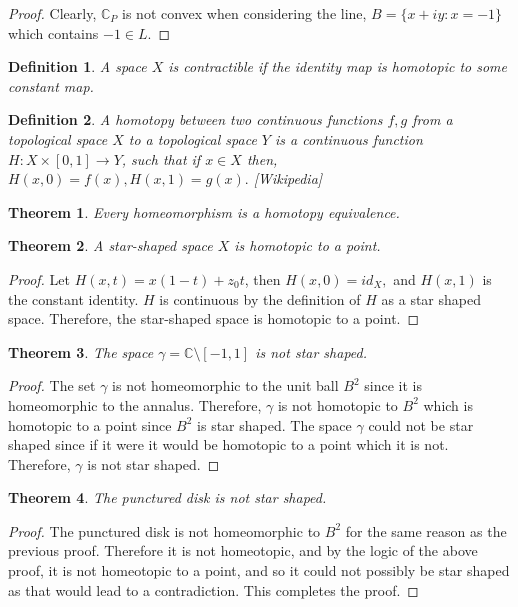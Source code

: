 \documentclass[letter]{article}
\newtheorem{theorem}{Theorem}
\newtheorem{definition}{Definition}
\newenvironment{menumerate}{%
  \edef\backupindent{\the\parindent}%
  \enumerate%
  \setlength{\parindent}{\backupindent}%
}{\endenumerate}
\begin{document}
\begin{menumerate}
\begin{proof}
		Clearly, $\mathbb{C}_P$ is not convex when considering the line, $B = \{x + iy : x = -1\}$ which contains $-1 \in L.$
 	\end{proof}
 	\begin{definition}
 		A space $X$ is contractible if the identity map is homotopic to some constant map.
 	\end{definition}
 	\begin{definition}
 		A homotopy between two continuous functions $f,g$ from a topological space $X$ to a topological space $Y$ is a continuous function $H: X \times [0,1] \to Y$, such that if $x \in X$ then,
 		$H(x,0) = f(x), H(x,1) = g(x).$ [Wikipedia]
 	\end{definition}
 	\begin{theorem}
 		Every homeomorphism is a homotopy equivalence.
 	\end{theorem}
 	\begin{theorem}
 		A star-shaped space $X$ is homotopic to a point.
 	\end{theorem}
 	\begin{proof}
 		Let $H(x,t) = x(1-t)+z_0t$, then $H(x,0) = id_X,$ and $H(x,1)$ is the constant identity. $H$ is continuous by the definition of $H$ as a star shaped space. Therefore, the star-shaped space is homotopic to a point.
 	\end{proof}
 	\begin{theorem}
 		The space $\gamma = \mathbb{C}\setminus[-1,1]$ is not star shaped.
 	\end{theorem}
 	\begin{proof}
 		The set $\gamma$ is not homeomorphic to the unit ball $B^2$ since it is homeomorphic to the annalus. Therefore, $\gamma$ is not homotopic to
 		$B^2$ which is homotopic to a point since $B^2$ is star shaped.
 		The space $\gamma$ could not be star shaped since if it were it would be homotopic to a point which it is not. Therefore, $\gamma$
 		is not star shaped. 
 	\end{proof}
 	\begin{theorem}
 		The punctured disk is not star shaped.
 	\end{theorem}
 	\begin{proof}
 		The punctured disk is not homeomorphic to $B^2$ for the same reason as the previous proof. Therefore it is not homeotopic, and by the logic of
 		the above proof, it is not homeotopic to a point, and so it could not possibly be star shaped as that would lead to a contradiction. This completes the proof.
 	\end{proof}

\end{menumerate}
\end{document}
